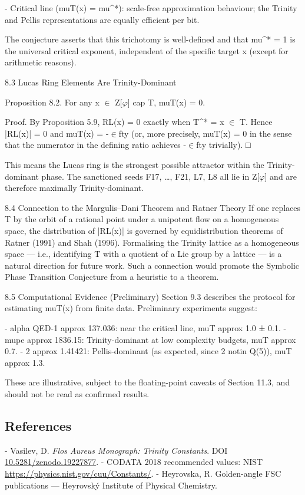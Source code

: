   - Critical line (muT(x) = mu\textasciicircum{}*): scale-free approximation behaviour; the Trinity and
  Pellis representations are equally efficient per bit.

  The conjecture asserts that this trichotomy is well-defined and that mu\textasciicircum{}* = 1 is the
  universal critical exponent, independent of the specific target x (except for arithmetic
  reasons).

  8.3 Lucas Ring Elements Are Trinity-Dominant

        Proposition 8.2. For any x $\in$ Z[$\varphi$] cap T, muT(x) = 0.

        Proof. By Proposition 5.9, RL(x) = 0 exactly when T\textasciicircum{}* = x $\in$ T. Hence |RL(x)| = 0
        and muT(x) = -$\in$fty (or, more precisely, muT(x) = 0 in the sense that the
        numerator in the defining ratio achieves -$\in$fty trivially). □

  This means the Lucas ring is the strongest possible attractor within the
  Trinity-dominant phase. The sanctioned seeds F17, …, F21, L7, L8 all lie in Z[$\varphi$] and are
  therefore maximally Trinity-dominant.

  8.4 Connection to the Margulis--Dani Theorem and Ratner Theory
  If one replaces T by the orbit of a rational point under a unipotent flow on a
  homogeneous space, the distribution of |RL(x)| is governed by equidistribution
  theorems of Ratner (1991) and Shah (1996). Formalising the Trinity lattice as a
  homogeneous space --- i.e., identifying T with a quotient of a Lie group by a lattice --- is
  a natural direction for future work. Such a connection would promote the Symbolic
  Phase Transition Conjecture from a heuristic to a theorem.

  8.5 Computational Evidence (Preliminary)
  Section 9.3 describes the protocol for estimating muT(x) from finite data. Preliminary
  experiments suggest:

  - alpha QED-1 approx 137.036: near the critical line, muT approx 1.0 ± 0.1.
  - mupe approx 1836.15: Trinity-dominant at low complexity budgets, muT approx 0.7.
  - 2 approx 1.41421: Pellis-dominant (as expected, since 2 notin Q(5)), muT approx 1.3.

  These are illustrative, subject to the floating-point caveats of Section 11.3, and should
  not be read as confirmed results.

\subsection{References}

- Vasilev, D. \textit{Flos Aureus Monograph: Trinity Constants}. DOI \href{https://zenodo.org/doi/10.5281/zenodo.19227877}{10.5281/zenodo.19227877}.
- CODATA 2018 recommended values: NIST \href{https://physics.nist.gov/cuu/Constants/}{https://physics.nist.gov/cuu/Constants/}.
- Heyrovska, R. Golden-angle FSC publications --- Heyrovský Institute of Physical Chemistry.
